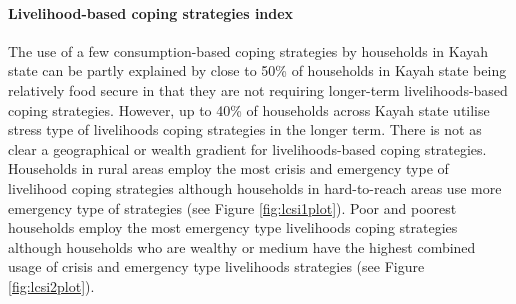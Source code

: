 \documentclass[12pt,a4paper]{article}
\let\oldparagraph\paragraph
\renewcommand{\paragraph}[1]{\oldparagraph{#1}\mbox{}}
\begin{document}
\hypertarget{lcsi-results}{%
\paragraph{Livelihood-based coping strategies index}\label{lcsi-results}}

The use of a few consumption-based coping strategies by households in Kayah state can be partly explained by close to 50\% of households in Kayah state being relatively food secure in that they are not requiring longer-term livelihoods-based coping strategies. However, up to 40\% of households across Kayah state utilise stress type of livelihoods coping strategies in the longer term. There is not as clear a geographical or wealth gradient for livelihoods-based coping strategies. Households in rural areas employ the most crisis and emergency type of livelihood coping strategies although households in hard-to-reach areas use more emergency type of strategies (see Figure \ref{fig:lcsi1plot}). Poor and poorest households employ the most emergency type livelihoods coping strategies although households who are wealthy or medium have the highest combined usage of crisis and emergency type livelihoods strategies (see Figure \ref{fig:lcsi2plot}).
\end{document}
